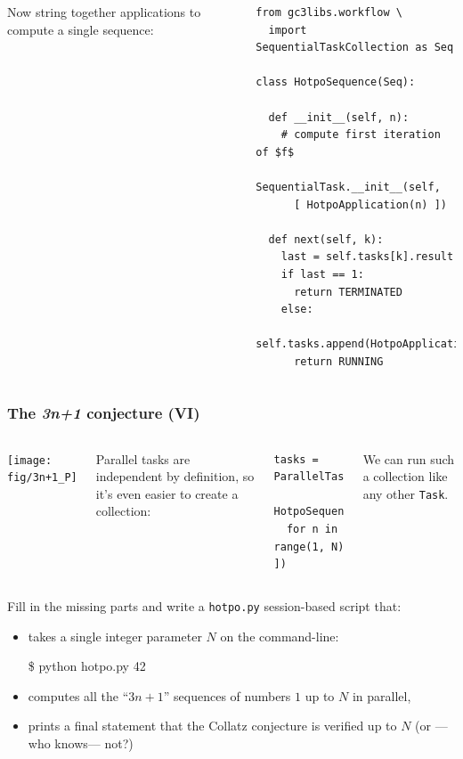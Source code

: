 \documentclass[english,serif,mathserif,xcolor=pdftex,dvipsnames,table]{beamer}
\begin{document}
\begin{frame}[fragile]
\begin{columns}
    \small
    Now string together applications to compute a
    single sequence:
    \begin{lstlisting}[basicstyle=\ttfamily\footnotesize]
from gc3libs.workflow \
  import SequentialTaskCollection as Seq

class HotpoSequence(Seq):

  def __init__(self, n):
    # compute first iteration of $f$
    SequentialTask.__init__(self,
      [ HotpoApplication(n) ])
  
  def next(self, k):
    last = self.tasks[k].result
    if last == 1:
      return TERMINATED
    else:
      self.tasks.append(HotpoApplication(last))
      return RUNNING
    \end{lstlisting}
  \end{columns}
\end{frame}

\begin{frame}[fragile]
  \frametitle{The \emph{3n+1} conjecture (VI)}
  \label{sec:15}

  \begin{columns}
    \begin{center}
      \texttt{[image: fig/3n+1\_P]}
    \end{center}

    \small
    Parallel tasks are independent by definition, so it's even easier to
    create a collection:
    \begin{lstlisting}
tasks = ParallelTaskCollection([
  HotpoSequence(n)
  for n in range(1, N) 
])
    \end{lstlisting}

    We can run such a collection like any other \texttt{Task}.
  \end{columns}
\end{frame}


\begin{frame}[fragile]
  \begin{exercise*}[11.A]

    \+
    Fill in the missing parts and write a \texttt{hotpo.py} session-based script that:
    \begin{itemize}
    \item takes a single integer parameter $N$ on the command-line:
      \begin{semiverbatim}
\$ python hotpo.py 42        
      \end{semiverbatim}
    \item computes all the ``$3n+1$'' sequences of numbers $1$ up to $N$ in parallel,
    \item prints a final statement that the Collatz conjecture is verified up to $N$ (or ---who knows--- not?)
    \end{itemize}
  \end{exercise*}
\end{frame}
\end{document}
